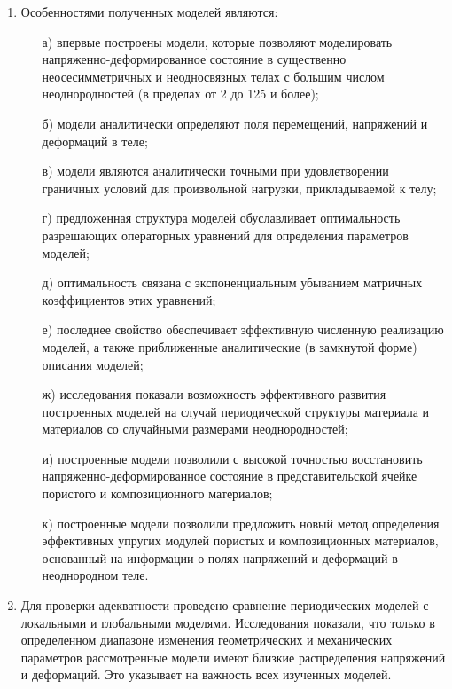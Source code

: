 \begin{enumerate}
\item Особенностями полученных моделей являются:
\begin{itemize}
\item[а)] впервые построены модели, которые позволяют моделировать напряженно-деформированное состояние в существенно неосесимметричных и неодносвязных телах с большим числом неоднородностей (в пределах от 2 до 125 и более);
\item[б)] модели аналитически определяют поля перемещений, напряжений и деформаций в теле;
\item[в)] модели являются аналитически точными при удовлетворении граничных условий для произвольной нагрузки, прикладываемой к телу;
\item[г)] предложенная структура моделей обуславливает оптимальность разрешающих операторных уравнений для определения параметров моделей;
\item[д)] оптимальность связана с экспоненциальным убыванием матричных коэффициентов этих уравнений;
\item[е)] последнее свойство обеспечивает эффективную численную реализацию моделей, а также приближенные аналитические (в замкнутой форме) описания моделей;
\item[ж)] исследования показали возможность эффективного развития построенных моделей на случай периодической структуры материала и материалов со случайными размерами неоднородностей;
\item[и)] построенные модели позволили с высокой точностью восстановить напряженно-деформированное состояние в представительской ячейке пористого и композиционного материалов;
\item[к)] построенные модели позволили предложить новый метод определения эффективных упругих модулей пористых и композиционных материалов, основанный на информации о полях напряжений и деформаций в неоднородном теле.
\end{itemize}
\item Для проверки адекватности проведено сравнение периодических моделей с локальными и глобальными моделями. Исследования показали, что только в определенном диапазоне изменения геометрических и механических параметров рассмотренные модели имеют близкие распределения напряжений и деформаций. Это указывает на важность всех изученных моделей.
\end{enumerate}
